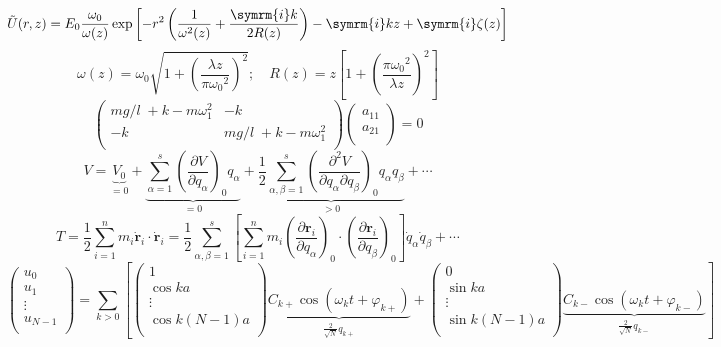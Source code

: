 \documentclass[11pt,fleqn]{article}
\def\ii{\symrm{i}}
\def\bm{\symbf}
\begin{document}
\[\tilde{U}(r,z)=E_0\dfrac{\omega_0}{\omega(z)}\exp\left[-r^2\left(\dfrac{1}{\omega^2(z)}+\dfrac{\ii k}{2R(z)}\right)-\ii k z+\ii \zeta(z)\right]\]
\[\omega(z)=\omega_0\sqrt{1+\left(\dfrac{\lambda z}{\pi {\omega_0}^2}\right)^2};\quad R(z)=z\left[1+\left(\dfrac{\pi {\omega_0}^2}{\lambda z}\right)^2\right]\]
\[\left( \begin{matrix}
{mg}/{l}\;+k-m\omega _{1}^{2} & -k  \\
-k & {mg}/{l}\;+k-m\omega _{1}^{2}  \\
\end{matrix} \right)\left( \begin{matrix}
{{a}_{11}}  \\
{{a}_{21}}  \\
\end{matrix} \right)=0\]
\[V=\underbrace{{{V}_{0}}}_{=0}+\underbrace{\sum\limits_{\alpha =1}^{s}{{{\left( \frac{\partial V}{\partial {{q}_{\alpha }}} \right)}_{0}}{{q}_{\alpha }}}}_{=0}+\underbrace{\frac{1}{2}\sum\limits_{\alpha ,\beta =1}^{s}{{{\left( \frac{{{\partial }^{2}}V}{\partial {{q}_{\alpha }}\partial {{q}_{\beta }}} \right)}_{0}}{{q}_{\alpha }}{{q}_{\beta }}}}_{>0}+\cdots \]
\[T=\frac{1}{2}\sum\limits_{i=1}^{n}{{{m}_{i}}{{{\dot{\bm r}}}_{i}}\cdot {{{\dot{\bm r}}}_{i}}}=\frac{1}{2}\sum\limits_{\alpha ,\beta =1}^{s}{\left[ \sum\limits_{i=1}^{n}{{{m}_{i}}{{\left( \frac{\partial {{\bm r}_{i}}}{\partial {{q}_{\alpha }}} \right)}_{0}}\cdot {{\left( \frac{\partial {{\bm r}_{i}}}{\partial {{q}_{\beta }}} \right)}_{0}}} \right]{{{\dot{q}}}_{\alpha }}{{{\dot{q}}}_{\beta }}}+\cdots \]
\[\left( \begin{matrix}
{{u}_{0}}  \\
{{u}_{1}}  \\
\vdots   \\
{{u}_{N-1}}  \\
\end{matrix} \right)=\sum\limits_{k>0}{\left[ \left( \begin{matrix}
	1  \\
	\cos ka  \\
	\vdots   \\
	\cos k\left( N-1 \right)a  \\
	\end{matrix} \right)\underbrace{{{C}_{k+}}\cos \left( {{\omega }_{k}}t+{{\varphi }_{k+}} \right)}_{\frac{2}{\sqrt{N}}{{q}_{k+}}}+\left( \begin{matrix}
	0  \\
	\sin ka  \\
	\vdots   \\
	\sin k\left( N-1 \right)a  \\
	\end{matrix} \right)\underbrace{{{C}_{k-}}\cos \left( {{\omega }_{k}}t+{{\varphi }_{k-}} \right)}_{\frac{2}{\sqrt{N}}{{q}_{k-}}} \right]}\]
\end{document}
